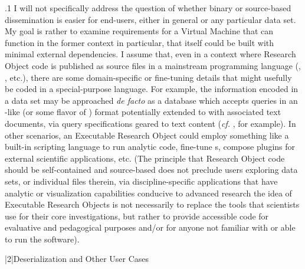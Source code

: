 \documentclass[11pt, twocolumn]{article}
\begin{document}
\p.1{%
I will not specifically address the question of whether binary or source-based
dissemination is easier for end-users, either in general or \visavis{} any
particular data set. My goal is rather to examine requirements for a
Virtual Machine that can function in the former context \mdash{} in particular,
that itself could be built with minimal external dependencies. I assume
that, even in a context where Research Object code is published
as source files in a mainstream programming language (, , etc.),
there are some domain-specific or fine-tuning details that
might usefully be coded in a special-purpose language. For example, the
information encoded in a data set may be approached \textit{de facto} as a
database which accepts queries in an -like (or some flavor of )
format \mdash{} potentially extended to  with
associated text documents, via query specifications
geared to text content (\textit{cf.} , for example). In other scenarios, an Executable Research Object
could employ something like a built-in scripting language to run
analytic code, fine-tune s, compose plugins for external scientific applications,
etc. (The principle that Research Object code should be self-contained and source-based
does not preclude users exploring data sets, or individual files therein,
via discipline-specific applications that have analytic or visualization capabilities
conducive to advanced research \mdash{} the idea of Executable Research Objects is not necessarily
to replace the tools that scientists use for their core investigations, but rather to
provide accessible code for evaluative and pedagogical purposes and/or for
anyone not familiar with or able to run the  software).
}%


\s|2|{Deserialization and Other User Cases}
\end{document}
